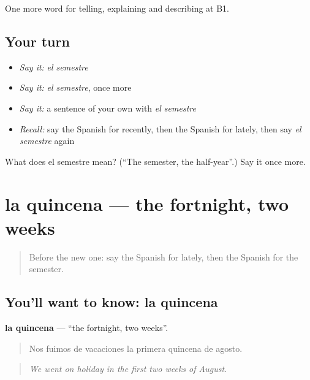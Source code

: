 \begin{grammarlens}[title={What you've built}]
One more word for telling, explaining and describing at B1.
\end{grammarlens}

\subsection*{Your turn}
\begin{itemize}
\raggedright
  \item \emph{Say it:} \emph{el semestre}
  \item \emph{Say it:} \emph{el semestre}, once more
  \item \emph{Say it:} a sentence of your own with \emph{el semestre}
  \item \emph{Recall:} say the Spanish for recently, then the Spanish for lately, then say \emph{el semestre} again
\end{itemize}

\begin{tcolorbox}[breakable,colback=teal!4,colframe=teal!35!black,title={Before you move on}]
What does el semestre mean? (\textquotedblleft{}The semester, the half-year\textquotedblright{}.) Say it once more.
\end{tcolorbox}
\section[la quincena]{la quincena — the fortnight, two weeks}

\label{lesson:ES-C539-quincena}



\begin{quote}
Before the new one: say the Spanish for lately, then the Spanish for the semester.
\end{quote}

\subsection*{You'll want to know: la quincena}
\textbf{la quincena} — \textquotedblleft{}the fortnight, two weeks\textquotedblright{}.

\begin{quote}
Nos fuimos de vacaciones la primera quincena de agosto.
\end{quote}

\begin{quote}
\emph{We went on holiday in the first two weeks of August.}
\end{quote}

